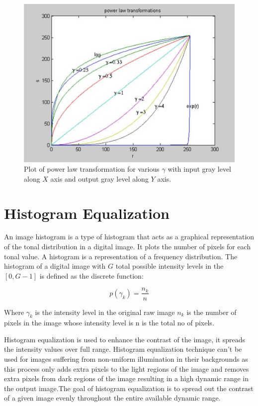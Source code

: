 \begin{figure}
	\centering
	\includegraphics[scale=0.9]{images/ch3/powerLawTransformation.jpg}
	\caption{Plot of power law transformation for various $\gamma$ with input gray level along $X$ axis and output
gray level along $Y$ axis.}
	\label{fig:powerLawTransformation}
\end{figure}

\section{Histogram Equalization}
An image histogram is a type of histogram that acts as a graphical representation of
the tonal distribution in a digital image\cite{he1}. It plots the number of pixels for each tonal
value. A histogram is a representation of a frequency distribution\cite{he2}. The histogram
of a digital image with $G$ total possible intensity levels in the $[0,G − 1]$ is defined
as the discrete function:

\begin{equation}
	p(\gamma_{k})=\frac{n_{k}}{n}
\end{equation}

Where $\gamma_{k}$ is the intensity level in the original raw image $n_{k}$ is the number of
pixels in the image whose intensity level is n is the total no of pixels\cite{he2}.

Histogram equalization is used to enhance the contrast of the image, it spreads the
intensity values over full range. Histogram equalization technique can’t be used for
images suffering from non-uniform illumination in their backgrounds as this process
only adds extra pixels to the light regions of the image and removes extra pixels from
dark regions of the image resulting in a high dynamic range in the output image\cite{he1}.The
goal of histogram equalization is to spread out the contrast of a given image evenly
throughout the entire available dynamic range\cite{he2}.

